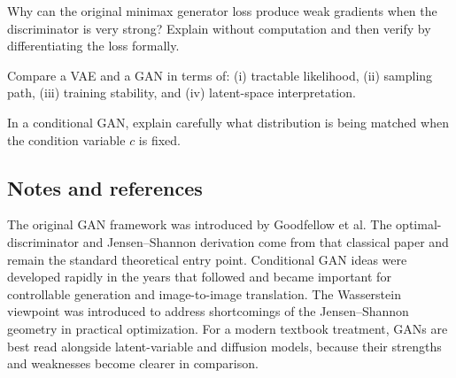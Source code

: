 \begin{exercise}
Why can the original minimax generator loss produce weak gradients when the discriminator is very strong? Explain without computation and then verify by differentiating the loss formally.
\end{exercise}

\begin{exercise}
Compare a VAE and a GAN in terms of: (i) tractable likelihood, (ii) sampling path, (iii) training stability, and (iv) latent-space interpretation.
\end{exercise}

\begin{exercise}
In a conditional GAN, explain carefully what distribution is being matched when the condition variable $c$ is fixed.
\end{exercise}

\subsection*{Notes and references}

The original GAN framework was introduced by Goodfellow et al.
The optimal-discriminator and Jensen--Shannon derivation come from that classical paper and remain the standard theoretical entry point.
Conditional GAN ideas were developed rapidly in the years that followed and became important for controllable generation and image-to-image translation.
The Wasserstein viewpoint was introduced to address shortcomings of the Jensen--Shannon geometry in practical optimization.
For a modern textbook treatment, GANs are best read alongside latent-variable and diffusion models, because their strengths and weaknesses become clearer in comparison.
